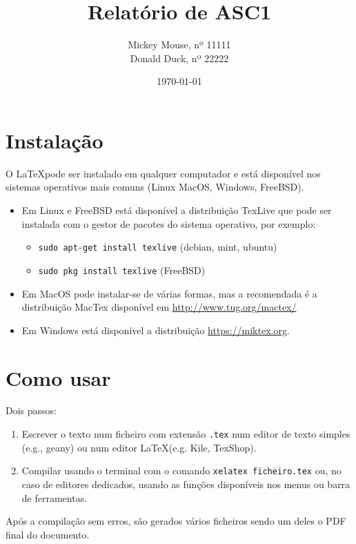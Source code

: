 \documentclass[11pt]{article}   %
\title{Relatório de ASC1}
\author{Mickey Mouse, nº 11111 \\ Donald Duck, nº 22222}
\date{\today}
\begin{document}
\maketitle



\section{Instalação}
\label{sec:instalacao}

O \LaTeX pode ser instalado em qualquer computador e está disponível nos sistemas operativos mais comuns (Linux MacOS, Windows, FreeBSD).

\begin{itemize}
    \item Em Linux e FreeBSD está disponível a distribuição TexLive que pode ser instalada com o gestor de pacotes do sistema operativo, por exemplo:
    \begin{itemize}
        \item \lstinline{sudo apt-get install texlive} (debian, mint, ubuntu)
        \item \lstinline{sudo pkg install texlive} (FreeBSD)
    \end{itemize}

    \item Em MacOS pode instalar-se de várias formas, mas a recomendada é a distribuição MacTex disponível em \url{http://www.tug.org/mactex/}
    \item Em Windows está disponível a distribuição \url{https://miktex.org}.
\end{itemize}

\section{Como usar}

Dois passos:
\begin{enumerate}
    \item Escrever o texto num ficheiro com extensão \lstinline{.tex} num editor de texto simples (e.g., geany) ou num editor \LaTeX (e.g. Kile, TexShop).
    \item Compilar usando o terminal com o comando \lstinline{xelatex ficheiro.tex} ou, no caso de editores dedicados, usando as funções disponíveis nos menus ou barra de ferramentas.
\end{enumerate}
Após a compilação sem erros, são gerados vários ficheiros sendo um deles o PDF final do documento.
\end{document}
